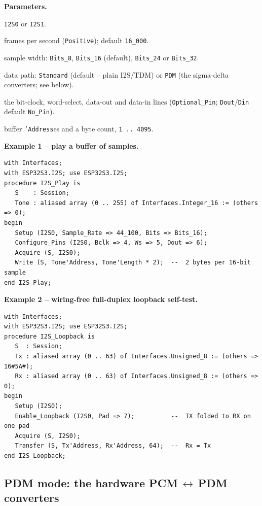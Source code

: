 \textbf{Parameters.}
\begin{description}[style=nextline]
\item[\texttt{Port}] \texttt{I2S0} or \texttt{I2S1}.
\item[\texttt{Sample\_Rate}] frames per second (\texttt{Positive}); default
  \texttt{16\_000}.
\item[\texttt{Bits}] sample width: \texttt{Bits\_8}, \texttt{Bits\_16} (default),
  \texttt{Bits\_24} or \texttt{Bits\_32}.
\item[\texttt{Mode}] data path: \texttt{Standard} (default -- plain I2S/TDM) or
  \texttt{PDM} (the sigma-delta converters; see below).
\item[\texttt{Bclk}, \texttt{Ws}, \texttt{Dout}, \texttt{Din}] the bit-clock,
  word-select, data-out and data-in lines (\texttt{Optional\_Pin};
  \texttt{Dout}/\texttt{Din} default \texttt{No\_Pin}).
\item[\texttt{Tx}, \texttt{Rx}, \texttt{Length}] buffer \texttt{'Address}es and a
  byte count, \texttt{1\,..\,4095}.
\end{description}

\textbf{Example 1 -- play a buffer of samples.}
\begin{lstlisting}
with Interfaces;
with ESP32S3.I2S; use ESP32S3.I2S;
procedure I2S_Play is
   S    : Session;
   Tone : aliased array (0 .. 255) of Interfaces.Integer_16 := (others => 0);
begin
   Setup (I2S0, Sample_Rate => 44_100, Bits => Bits_16);
   Configure_Pins (I2S0, Bclk => 4, Ws => 5, Dout => 6);
   Acquire (S, I2S0);
   Write (S, Tone'Address, Tone'Length * 2);  --  2 bytes per 16-bit sample
end I2S_Play;
\end{lstlisting}

\textbf{Example 2 -- wiring-free full-duplex loopback self-test.}
\begin{lstlisting}
with Interfaces;
with ESP32S3.I2S; use ESP32S3.I2S;
procedure I2S_Loopback is
   S  : Session;
   Tx : aliased array (0 .. 63) of Interfaces.Unsigned_8 := (others => 16#5A#);
   Rx : aliased array (0 .. 63) of Interfaces.Unsigned_8 := (others => 0);
begin
   Setup (I2S0);
   Enable_Loopback (I2S0, Pad => 7);          --  TX folded to RX on one pad
   Acquire (S, I2S0);
   Transfer (S, Tx'Address, Rx'Address, 64);  --  Rx = Tx
end I2S_Loopback;
\end{lstlisting}

\subsection{PDM mode: the hardware PCM\,$\leftrightarrow$\,PDM converters}

